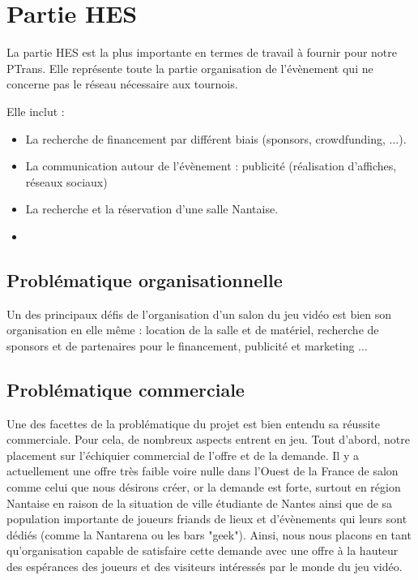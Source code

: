 \documentclass[french]{article}
\begin{document}
\newpage

\section{Partie HES}

La partie HES est la plus importante en termes de travail à fournir pour notre PTrans. Elle représente toute la partie organisation de l'évènement qui ne concerne pas le réseau nécessaire aux tournois.

Elle inclut :
\begin{itemize}
\item La recherche de financement par différent biais (sponsors, crowdfunding, ...).
\item La communication autour de l'évènement : publicité (réalisation d'affiches, réseaux sociaux)
\item La recherche et la réservation d'une salle Nantaise.
\item 
\end{itemize}

\subsection{Problématique organisationnelle}

Un des principaux défis de l'organisation d'un salon du jeu vidéo est bien son organisation en elle même : location de la salle et de matériel, recherche de sponsors et de partenaires pour le financement, publicité et marketing ...

\subsection{Problématique commerciale}

Une des facettes de la problématique du projet est bien entendu sa réussite commerciale. Pour cela, de nombreux aspects entrent en jeu. Tout d'abord, notre placement sur l'échiquier commercial de l'offre et de la demande. Il y a actuellement une offre très faible voire nulle dans l'Ouest de la France de salon comme celui que nous désirons créer, or la demande est forte, surtout en région Nantaise en raison de la situation de ville étudiante de Nantes ainsi que de sa population importante de joueurs friands de lieux et d'évènements qui leurs sont dédiés (comme la Nantarena ou les bars "geek"). Ainsi, nous nous placons en tant qu'organisation capable de satisfaire cette demande avec une offre à la hauteur des espérances des joueurs et des visiteurs intéressés par le monde du jeu vidéo.
\end{document}

